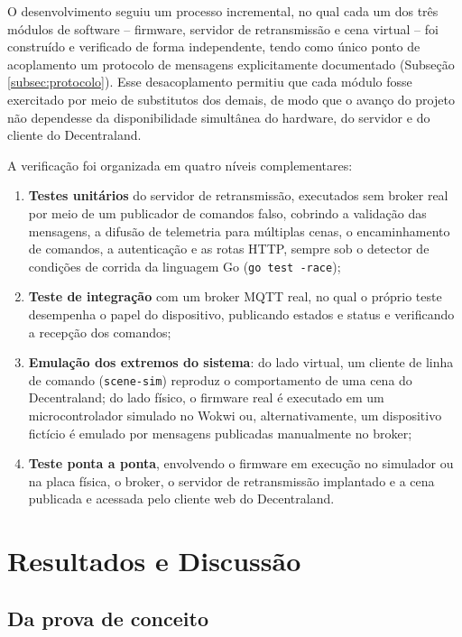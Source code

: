 \documentclass[12pt]{article}
\begin{document}
O desenvolvimento seguiu um processo incremental, no qual cada um dos três módulos de software -- firmware, servidor de retransmissão e cena virtual -- foi construído e verificado de forma independente, tendo como único ponto de acoplamento um protocolo de mensagens explicitamente documentado (Subseção \ref{subsec:protocolo}). Esse desacoplamento permitiu que cada módulo fosse exercitado por meio de substitutos dos demais, de modo que o avanço do projeto não dependesse da disponibilidade simultânea do hardware, do servidor e do cliente do Decentraland.

A verificação foi organizada em quatro níveis complementares:

\begin{enumerate}
    \item \textbf{Testes unitários} do servidor de retransmissão, executados sem broker real por meio de um publicador de comandos falso, cobrindo a validação das mensagens, a difusão de telemetria para múltiplas cenas, o encaminhamento de comandos, a autenticação e as rotas HTTP, sempre sob o detector de condições de corrida da linguagem Go (\texttt{go test -race});
    \item \textbf{Teste de integração} com um broker MQTT real, no qual o próprio teste desempenha o papel do dispositivo, publicando estados e status e verificando a recepção dos comandos;
    \item \textbf{Emulação dos extremos do sistema}: do lado virtual, um cliente de linha de comando (\texttt{scene-sim}) reproduz o comportamento de uma cena do Decentraland; do lado físico, o firmware real é executado em um microcontrolador simulado no Wokwi \cite{wokwi} ou, alternativamente, um dispositivo fictício é emulado por mensagens publicadas manualmente no broker;
    \item \textbf{Teste ponta a ponta}, envolvendo o firmware em execução no simulador ou na placa física, o broker, o servidor de retransmissão implantado e a cena publicada e acessada pelo cliente web do Decentraland.
\end{enumerate}

\section{Resultados e Discussão}

\subsection{Da prova de conceito}
\label{res:poc}
\end{document}
